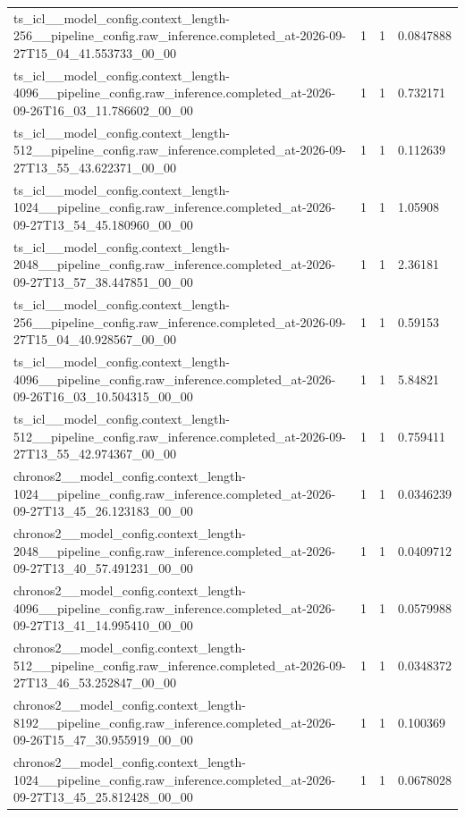 \begin{tabular}{llll}
ts\_icl\_\_model\_config.context\_length-256\_\_pipeline\_config.raw\_inference.completed\_at-2026-09-27T15\_04\_41.553733\_00\_00 & 1 & 1 & 0.0847888 \\
ts\_icl\_\_model\_config.context\_length-4096\_\_pipeline\_config.raw\_inference.completed\_at-2026-09-26T16\_03\_11.786602\_00\_00 & 1 & 1 & 0.732171 \\
ts\_icl\_\_model\_config.context\_length-512\_\_pipeline\_config.raw\_inference.completed\_at-2026-09-27T13\_55\_43.622371\_00\_00 & 1 & 1 & 0.112639 \\
ts\_icl\_\_model\_config.context\_length-1024\_\_pipeline\_config.raw\_inference.completed\_at-2026-09-27T13\_54\_45.180960\_00\_00 & 1 & 1 & 1.05908 \\
ts\_icl\_\_model\_config.context\_length-2048\_\_pipeline\_config.raw\_inference.completed\_at-2026-09-27T13\_57\_38.447851\_00\_00 & 1 & 1 & 2.36181 \\
ts\_icl\_\_model\_config.context\_length-256\_\_pipeline\_config.raw\_inference.completed\_at-2026-09-27T15\_04\_40.928567\_00\_00 & 1 & 1 & 0.59153 \\
ts\_icl\_\_model\_config.context\_length-4096\_\_pipeline\_config.raw\_inference.completed\_at-2026-09-26T16\_03\_10.504315\_00\_00 & 1 & 1 & 5.84821 \\
ts\_icl\_\_model\_config.context\_length-512\_\_pipeline\_config.raw\_inference.completed\_at-2026-09-27T13\_55\_42.974367\_00\_00 & 1 & 1 & 0.759411 \\
chronos2\_\_model\_config.context\_length-1024\_\_pipeline\_config.raw\_inference.completed\_at-2026-09-27T13\_45\_26.123183\_00\_00 & 1 & 1 & 0.0346239 \\
chronos2\_\_model\_config.context\_length-2048\_\_pipeline\_config.raw\_inference.completed\_at-2026-09-27T13\_40\_57.491231\_00\_00 & 1 & 1 & 0.0409712 \\
chronos2\_\_model\_config.context\_length-4096\_\_pipeline\_config.raw\_inference.completed\_at-2026-09-27T13\_41\_14.995410\_00\_00 & 1 & 1 & 0.0579988 \\
chronos2\_\_model\_config.context\_length-512\_\_pipeline\_config.raw\_inference.completed\_at-2026-09-27T13\_46\_53.252847\_00\_00 & 1 & 1 & 0.0348372 \\
chronos2\_\_model\_config.context\_length-8192\_\_pipeline\_config.raw\_inference.completed\_at-2026-09-26T15\_47\_30.955919\_00\_00 & 1 & 1 & 0.100369 \\
chronos2\_\_model\_config.context\_length-1024\_\_pipeline\_config.raw\_inference.completed\_at-2026-09-27T13\_45\_25.812428\_00\_00 & 1 & 1 & 0.0678028 \\

\end{tabular}
